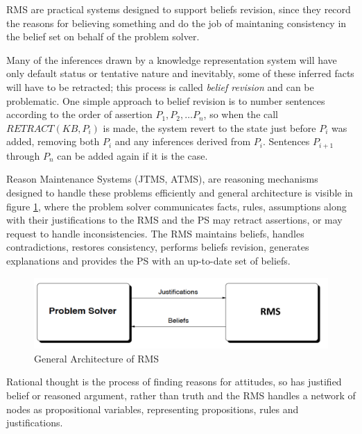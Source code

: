 RMS are practical systems designed to support beliefs revision, since they record
the reasons for believing something and do the job of maintaning consistency
in the belief set on behalf of the problem solver.

Many of the inferences drawn by a knowledge representation system will have only
default status or tentative nature and inevitably, some of these inferred facts
will have to be retracted; this process is called \emph{belief revision} and
can be problematic.\newline
One simple approach to belief revision is to number sentences according to the order
of assertion $P_1, P_2, \dots P_n$, so when the call $RETRACT(KB, P_i)$ is made, the 
system revert to the state just before $P_i$ was added, removing both $P_i$ and any
inferences derived from $P_i$.\newline
Sentences $P_{i+1}$ through $P_n$ can be added again if it is the case.

Reason Maintenance Systems (JTMS, ATMS), are reasoning mechanisms designed to handle
these problems efficiently and general architecture is visible in figure \ref{img:rms},
where the problem solver communicates facts, rules, assumptions along with their
justifications to the RMS and the PS may retract assertions, or may request to
handle inconsistencies.\newline
The RMS maintains beliefs, handles contradictions, restores consistency, performs
beliefs revision, generates explanations and provides the PS 
with an up-to-date set of beliefs.

\begin{figure}
	\includegraphics[width=\textwidth]{Images/architectureRMS}
	\caption{General Architecture of RMS}
	\label{img:rms}
\end{figure}
Rational thought is the process of finding reasons for attitudes, so has justified
belief or reasoned argument, rather than truth and the RMS handles a network of nodes
as propositional variables, representing propositions, rules and justifications.

